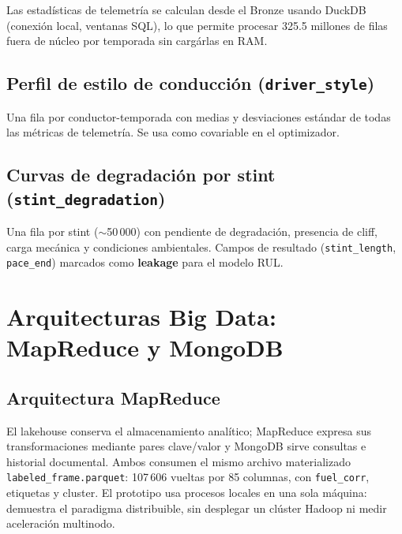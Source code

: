 \documentclass[conference]{IEEEtran}
\begin{document}
Las estadísticas de telemetría se calculan desde el Bronze usando DuckDB
(conexión local, ventanas SQL), lo que permite procesar 325.5 millones de
filas fuera de núcleo por temporada sin cargárlas en RAM.

\subsection{Perfil de estilo de conducción (\texttt{driver\_style})}

Una fila por conductor-temporada con medias y desviaciones estándar de
todas las métricas de telemetría. Se usa como covariable en el optimizador.

\subsection{Curvas de degradación por stint (\texttt{stint\_degradation})}

Una fila por stint ($\sim$50\,000) con pendiente de degradación, presencia
de cliff, carga mecánica y condiciones ambientales. Campos de resultado
(\texttt{stint\_length}, \texttt{pace\_end}) marcados como \textbf{leakage}
para el modelo RUL.

\section{Arquitecturas Big Data: MapReduce y MongoDB}
\label{sec:phase9}

\subsection{Arquitectura MapReduce}
El lakehouse conserva el almacenamiento analítico; MapReduce expresa sus
transformaciones mediante pares clave/valor y MongoDB sirve consultas e
historial documental. Ambos consumen el mismo archivo materializado
\texttt{labeled\_frame.parquet}: 107\,606 vueltas por 85 columnas, con
\texttt{fuel\_corr}, etiquetas y cluster. El prototipo usa procesos locales
en una sola máquina: demuestra el paradigma distribuible, sin desplegar
un clúster Hadoop ni medir aceleración multinodo.
\end{document}
